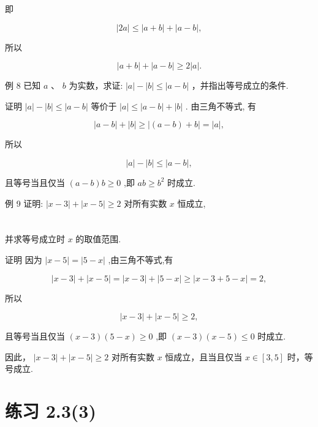 \documentclass[10pt]{article}
\begin{document}
即

\[
\left| {2a}\right|  \leq  \left| {a + b}\right|  + \left| {a - b}\right| ,
\]

所以

\[
\left| {a + b}\right|  + \left| {a - b}\right|  \geq  2\left| a\right| .
\]

例 8 已知 \(a\text{ 、 }b\) 为实数，求证: \(\left| a\right|  - \left| b\right|  \leq  \left| {a - b}\right|\) ，并指出等号成立的条件.

证明 \(\left| a\right|  - \left| b\right|  \leq  \left| {a - b}\right|\) 等价于 \(\left| a\right|  \leq  \left| {a - b}\right|  + \left| b\right|\) . 由三角不等式, 有

\[
\left| {a - b}\right|  + \left| b\right|  \geq  \left| {\left( {a - b}\right)  + b}\right|  = \left| a\right| ,
\]

所以

\[
\left| a\right|  - \left| b\right|  \leq  \left| {a - b}\right| ,
\]

且等号当且仅当 \(\left( {a - b}\right) b \geq  0\) ,即 \({ab} \geq  {b}^{2}\) 时成立.

例 9 证明: \(\left| {x - 3}\right|  + \left| {x - 5}\right|  \geq  2\) 对所有实数 \(x\) 恒成立,



\section*{}

并求等号成立时 \(x\) 的取值范围.

证明 因为 \(\left| {x - 5}\right|  = \left| {5 - x}\right|\) ,由三角不等式,有

\[
\left| {x - 3}\right|  + \left| {x - 5}\right|  = \left| {x - 3}\right|  + \left| {5 - x}\right|  \geq  \left| {x - 3 + 5 - x}\right|  = 2,
\]

所以

\[
\left| {x - 3}\right|  + \left| {x - 5}\right|  \geq  2,
\]

且等号当且仅当 \(\left( {x - 3}\right) \left( {5 - x}\right)  \geq  0\) ,即 \(\left( {x - 3}\right) \left( {x - 5}\right)  \leq  0\) 时成立.

因此， \(\left| {x - 3}\right|  + \left| {x - 5}\right|  \geq  2\) 对所有实数 \(x\) 恒成立，且当且仅当 \(x \in  \left\lbrack  {3,5}\right\rbrack\) 时，等号成立.

\section*{练习 2.3(3)}
\end{document}
